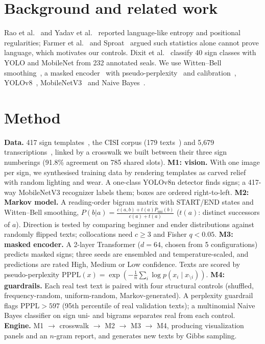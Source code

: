 \documentclass[11pt,a4paper,twocolumn]{article}
\begin{document}
\section{Background and related work}
Rao et al.~\cite{rao2009} and Yadav et al.~\cite{yadav2010} reported language-like entropy and
positional regularities; Farmer et al.~\cite{farmer2004} and Sproat~\cite{sproat2014} argued such
statistics alone cannot prove language, which motivates our controls. Dixit et al.~\cite{dixit2025}
classify 40 sign classes with YOLO and MobileNet from 232 annotated seals. We use Witten--Bell
smoothing~\cite{wittenbell1991}, a masked encoder~\cite{devlin2019} with
pseudo-perplexity~\cite{salazar2020} and calibration~\cite{guo2017}, YOLOv8~\cite{yolov8},
MobileNetV3~\cite{howard2019} and Naive Bayes~\cite{russell2021aima}.

\section{Method}
\textbf{Data.} 417 sign templates~\cite{im417}, the CISI corpus (179 texts~\cite{cisi1987}) and 5,679
transcriptions~\cite{wells2015,csvsource}, linked by a crosswalk we built between their three sign
numberings (91.8\% agreement on 785 shared slots).
\textbf{M1: vision.} With one image per sign, we synthesised training data by rendering templates as
carved relief with random lighting and wear. A one-class YOLOv8n detector finds signs; a 417-way MobileNetV3 recognizer labels them;
boxes are ordered right-to-left.
\textbf{M2: Markov model.} A reading-order bigram matrix with START/END states and Witten--Bell
smoothing, $P(b|a)=\frac{c(a,b)+t(a)P_{\text{uni}}(b)}{c(a)+t(a)}$ ($t(a)$: distinct successors of
$a$). Direction is tested by comparing beginner and ender distributions against randomly flipped
texts; collocations need $c\ge3$ and Fisher $q<0.05$.
\textbf{M3: masked encoder.} A 2-layer Transformer ($d{=}64$, chosen from 5 configurations) predicts
masked signs; three seeds are ensembled and temperature-scaled, and predictions are rated High, Medium or
Low confidence. Texts are scored by pseudo-perplexity
$\mathrm{PPPL}(x)=\exp(-\frac{1}{n}\sum_i\log p(x_i\mid x_{\setminus i}))$.
\textbf{M4: guardrails.} Each real test text is paired with four structural controls (shuffled,
frequency-random, uniform-random, Markov-generated). A perplexity guardrail flags
$\mathrm{PPPL}>597$ (95th percentile of real validation texts); a multinomial Naive Bayes classifier on
sign uni- and bigrams separates real from each control.
\textbf{Engine.} M1 $\rightarrow$ crosswalk $\rightarrow$ M2 $\rightarrow$ M3 $\rightarrow$ M4, producing
visualization panels and an $n$-gram report, and generates new texts by Gibbs sampling.
\end{document}
